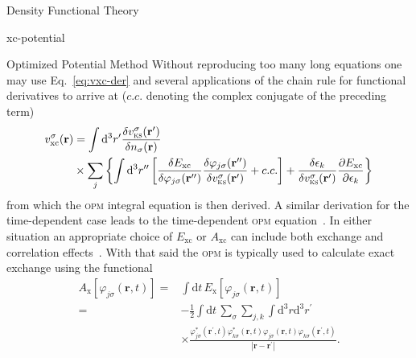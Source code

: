 \documentclass[letterpaper, 11 pt]{report}
\begin{document}
\begin{chapter}{Density Functional Theory \label{chap:dft}}
\begin{section}{xc-potential \label{sec:xcpot}}
\begin{subsection}{Optimized Potential Method \label{sec:opm}}
         Without reproducing too many long equations one may use Eq.~\eqref{eq:vxc-der} and several
         applications of the chain rule for functional derivatives to arrive at ($c.c.$ denoting the
         complex conjugate of the preceding term)
         \begin{equation} \label{eq:opm1}
            \begin{split}
               v^\sigma_\mathrm{xc}(\mathbf{r}) & = \int \mathrm{d}^3 r^\prime
                  \frac{\delta v^\sigma_\mathrm{\textsc{ks}}(\mathbf{r^\prime})}
                       {\delta n_\sigma(\mathbf{r}) } \\
                                    & \times \sum\limits_{j} \left\{ \int \mathrm{d}^3 r^{\prime\prime}
                \left[
               \frac{\delta E_\mathrm{xc}}{\delta \varphi_{j\sigma}(\mathbf{r^{\prime\prime}}) }
               \frac{\delta \varphi_{j\sigma}(\mathbf{r^{\prime\prime}}) }
                    {\delta v^\sigma_\mathrm{\textsc{ks}}(\mathbf{r^{\prime}}) }
               + c.c.
            \right]
               + \frac{\delta \epsilon_k}{\delta v^\sigma_\mathrm{\textsc{ks}}(\mathbf{r^{\prime}})}
              \frac{\partial E_\mathrm{xc}}{\partial \epsilon_k}
            \right\}
            \end{split}
         \end{equation}
         from which the \textsc{opm} integral equation is then derived. A similar derivation for the
         time-dependent case leads to the time-dependent \textsc{opm} equation~\cite{tdopm}. In either
         situation an appropriate choice of $E_\mathrm{xc}$ or $A_\mathrm{xc}$ can include both exchange
         and correlation effects~\cite{opm5, tdopm}. With that said the \textsc{opm} is typically used
         to calculate exact exchange using the functional
         \begin{equation} \label{eq:xfunc}
            \begin{split}
               A_\mathrm{x}[\varphi_{j\sigma}(\mathbf{r},t)]
                 = & \int \mathrm{d} t \, E_\mathrm{x}[\varphi_{j\sigma}(\mathbf{r},t)] \\
                = & -\frac{1}{2} \int \mathrm{d} t \, \sum\limits_\sigma \sum\limits_{j,k}
                    \int\mathrm{d}^3 r \mathrm{d}^3 r^\prime \\
                   & \times \frac{ \varphi^*_{j\sigma}(\mathbf{r}^\prime,t)
                           \varphi^*_{k\sigma}(\mathbf{r},t)
                           \varphi_{j\sigma}(\mathbf{r},t) \varphi_{k\sigma}(\mathbf{r}^\prime,t)}
                   {\left| \mathbf{r} -\mathbf{r}^\prime \right|}.
            \end{split}
         \end{equation}


\end{subsection}
\end{section}
\end{chapter}
\end{document}
